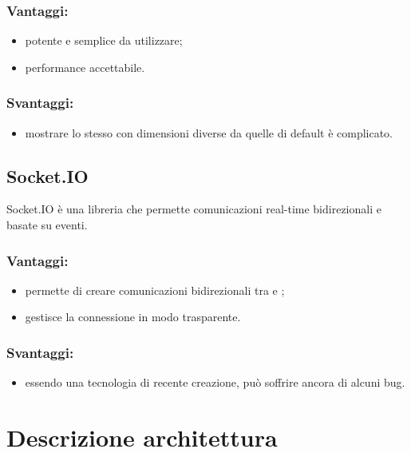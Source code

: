 \documentclass[a4paper, titlepage]{article}
\begin{document}
\subsubsection{Vantaggi:}

\begin{itemize}
	\item potente e semplice da utilizzare;
	\item performance accettabile.
\end{itemize}

\subsubsection{Svantaggi:}
\begin{itemize}
	\item mostrare lo stesso  con dimensioni diverse da quelle di default è complicato.
\end{itemize}

\subsection{Socket.IO}
Socket.IO è una libreria  che permette comunicazioni real-time bidirezionali e basate su eventi.

\subsubsection{Vantaggi:}
\begin{itemize}
	\item permette di creare comunicazioni bidirezionali tra  e ;
	\item gestisce la connessione in modo trasparente.
\end{itemize}

\subsubsection{Svantaggi:}

\begin{itemize}
	\item essendo una tecnologia di recente creazione, può soffrire ancora di alcuni bug.
\end{itemize}

\newpage
\section{Descrizione architettura}
\end{document}
